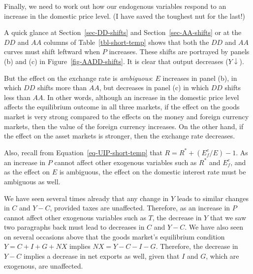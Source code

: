 \documentclass[
  letterpaper,
]{book}
\theoremstyle{plain}
\theoremstyle{remark}
\begin{document}
Finally, we need to work out how our endogenous variables respond to an
increase in the domestic price level. (I have saved the toughest nut for
the last!)

A quick glance at Section~\ref{sec-DD-shifts} and
Section~\ref{sec-AA-shifts} or at the \(DD\) and \(AA\) columns of
Table~\ref{tbl-short-temp} shows that both the \(DD\) and \(AA\) curves
must shift leftward when \(P\) increases. These shifts are portrayed by
panels (b) and (c) in Figure~\ref{fig-AADD-shifts}. It is clear that
output decreases (\(Y\downarrow\)).

But the effect on the exchange rate is \emph{ambiguous}: \(E\) increases
in panel (b), in which \(DD\) shifts more than \(AA\), but decreases in
panel (c) in which \(DD\) shifts less than \(AA\). In other words,
although an increase in the domestic price level affects the equilibrium
outcome in all three markets, if the effect on the goods market is very
strong compared to the effects on the money and foreign currency
markets, then the value of the foreign currency increases. On the other
hand, if the effect on the asset markets is stronger, then the exchange
rate decreases.

Also, recall from Equation~\ref{eq-UIP-short-temp} that
\(R=R^*+(E^e_f/E)-1\). As an increase in \(P\) cannot affect other
exogenous variables such as \(R^*\) and \(E_f^e\), and as the effect on
\(E\) is ambiguous, the effect on the domestic interest rate must be
ambiguous as well.

We have seen several times already that any change in \(Y\) leads to
similar changes in \(C\) and \(Y-C\), provided taxes are unaffected.
Therefore, as an increase in \(P\) cannot affect other exogenous
variables such as \(T\), the decrease in \(Y\) that we saw two
paragraphs back must lead to decreases in \(C\) and \(Y-C\). We have
also seen on several occasions above that the goods market's equilibrium
condition \(Y=C+I+G+NX\) implies \(NX=Y-C-I-G\). Therefore, the decrease
in \(Y-C\) implies a decrease in net exports as well, given that \(I\)
and \(G\), which are exogenous, are unaffected.
\end{document}

